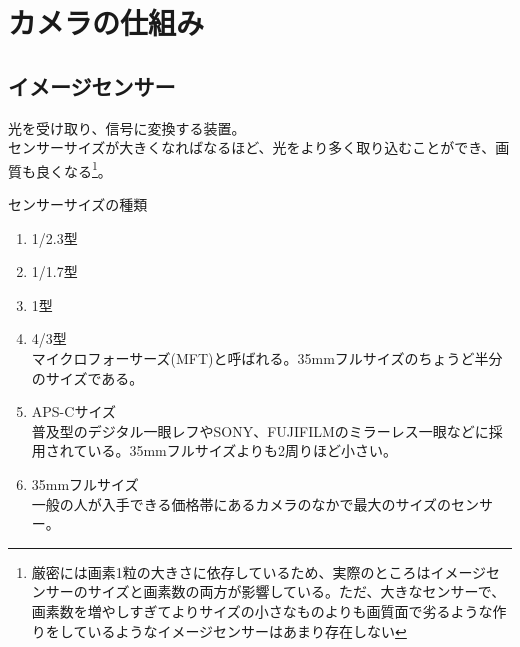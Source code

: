 \documentclass[dvipdfmx,jb5]{jreport}
\begin{document}
\section{カメラの仕組み} \label{sec:カメラの仕組み}
\subsection{イメージセンサー}
光を受け取り、信号に変換する装置。\\
センサーサイズが大きくなればなるほど、光をより多く取り込むことができ、画質も良くなる\footnote{厳密には画素1粒の大きさに依存しているため、実際のところはイメージセンサーのサイズと画素数の両方が影響している。ただ、大きなセンサーで、画素数を増やしすぎてよりサイズの小さなものよりも画質面で劣るような作りをしているようなイメージセンサーはあまり存在しない}。
\begin{itembox}[l]{センサーサイズの種類}
      \begin{enumerate}
            \item 1/2.3型
            \item 1/1.7型
            \item 1型
            \item 4/3型\\ マイクロフォーサーズ(MFT)と呼ばれる。35mmフルサイズのちょうど半分のサイズである。
            \item APS-Cサイズ\\
                  普及型のデジタル一眼レフやSONY、FUJIFILMのミラーレス一眼などに採用されている。35mmフルサイズよりも2周りほど小さい。
            \item 35mmフルサイズ\\
                  一般の人が入手できる価格帯にあるカメラのなかで最大のサイズのセンサー。
      \end{enumerate}
\end{itembox}
\end{document}

